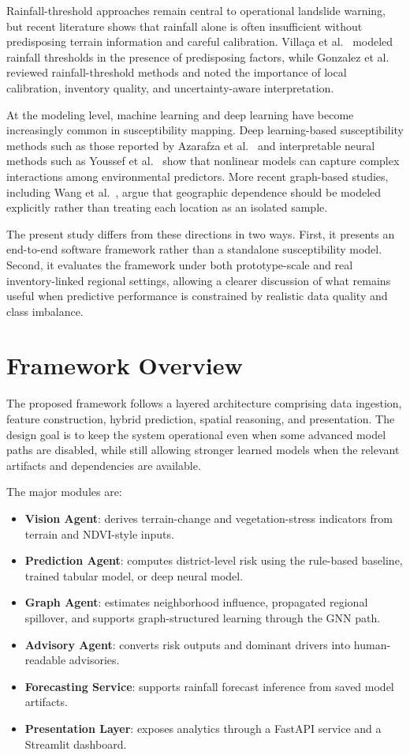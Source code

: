 \documentclass[pdflatex,sn-mathphys-num]{sn-jnl}
\begin{document}
Rainfall-threshold approaches remain central to operational landslide warning, but recent literature shows that rainfall alone is often insufficient without predisposing terrain information and careful calibration. Villa\c{c}a et al.~\cite{villac_a2024} modeled rainfall thresholds in the presence of predisposing factors, while Gonzalez et al.~\cite{gonzalez2023} reviewed rainfall-threshold methods and noted the importance of local calibration, inventory quality, and uncertainty-aware interpretation.

At the modeling level, machine learning and deep learning have become increasingly common in susceptibility mapping. Deep learning-based susceptibility methods such as those reported by Azarafza et al.~\cite{azarafza2021} and interpretable neural methods such as Youssef et al.~\cite{youssef2023} show that nonlinear models can capture complex interactions among environmental predictors. More recent graph-based studies, including Wang et al.~\cite{wang2024gnn}, argue that geographic dependence should be modeled explicitly rather than treating each location as an isolated sample.

The present study differs from these directions in two ways. First, it presents an end-to-end software framework rather than a standalone susceptibility model. Second, it evaluates the framework under both prototype-scale and real inventory-linked regional settings, allowing a clearer discussion of what remains useful when predictive performance is constrained by realistic data quality and class imbalance.

\section{Framework Overview}

The proposed framework follows a layered architecture comprising data ingestion, feature construction, hybrid prediction, spatial reasoning, and presentation. The design goal is to keep the system operational even when some advanced model paths are disabled, while still allowing stronger learned models when the relevant artifacts and dependencies are available.

The major modules are:
\begin{itemize}
\item \textbf{Vision Agent}: derives terrain-change and vegetation-stress indicators from terrain and NDVI-style inputs.
\item \textbf{Prediction Agent}: computes district-level risk using the rule-based baseline, trained tabular model, or deep neural model.
\item \textbf{Graph Agent}: estimates neighborhood influence, propagated regional spillover, and supports graph-structured learning through the GNN path.
\item \textbf{Advisory Agent}: converts risk outputs and dominant drivers into human-readable advisories.
\item \textbf{Forecasting Service}: supports rainfall forecast inference from saved model artifacts.
\item \textbf{Presentation Layer}: exposes analytics through a FastAPI service and a Streamlit dashboard.
\end{itemize}
\end{document}
